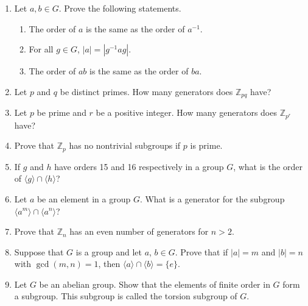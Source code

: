 {\begin{enumerate}
\begin{multicols}{2}
\begin{enumerate}
 \item
$971^{ 321} \pmod{ 765}$
 
\end{enumerate}
\end{multicols}
 
 
  
 
\item
Let $a, b \in G$.  Prove the following statements.
\begin{enumerate}
 
 \item
The order of $a$ is the same as the order of $a^{-1}$.
 
 \item
For all $g \in G$, $|a| = |g^{-1}ag|$.
 
 \item
The order of $ab$ is the same as the order of $ba$.
 
\end{enumerate}
 
 
\item
Let $p$ and $q$ be distinct primes.  How many generators does ${\mathbb
Z}_{pq}$ have? 
 
 
\item
Let $p$ be prime and $r$ be a positive integer.  How many generators
does ${\mathbb Z}_{p^r}$ have? 
 
 
\item
Prove that  ${\mathbb Z}_{p}$ has no nontrivial subgroups if $p$ is
prime. 
 
 
\item
If $g$ and $h$ have orders 15 and 16 respectively in a group $G$, what
is the order of $\langle g \rangle  \cap \langle h \rangle $? 
 
 
\item
Let $a$ be an element in a group $G$. What is a generator for the
subgroup $\langle a^m \rangle  \cap  \langle a^n \rangle $?
 
 
\item
Prove that ${\mathbb Z}_n$ has an even number of generators for $n>2$. 
 
 
\item
Suppose that $G$ is a group and let $a$, $b \in G$. Prove that if $|a|
= m$ and $|b| = n$ with $\gcd(m,n) = 1$, then $\langle a \rangle  \cap
\langle b \rangle  = \{ e \}$. 
 
 
\item
Let $G$ be an abelian group. Show that the elements of finite order in
$G$ form a subgroup. This subgroup is called the {\bfi torsion
subgroup} of $G$. 
 

\end{enumerate}}
